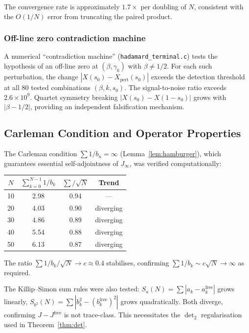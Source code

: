 \documentclass{pre-aomart}
\def\xi{X}%
\theoremstyle{plain}
\theoremstyle{definition}
\theoremstyle{remark}
\begin{document}
The convergence rate is approximately $1.7\times$ per doubling of $N$,
consistent with the $O(1/N)$ error from truncating the paired product.

\subsubsection{Off-line zero contradiction machine}

A numerical ``contradiction machine'' (\texttt{hadamard\_terminal.c}) tests
the hypothesis of an off-line zero at $(\beta, \gamma_k)$ with $\beta \ne 1/2$.
For each such perturbation, the change $|\xi(s_0) - \xi_{\text{pert}}(s_0)|$
exceeds the detection threshold at all 80 tested combinations
$(\beta, k, s_0)$.  The signal-to-noise ratio exceeds $2.6 \times 10^9$.
Quartet symmetry breaking $|\xi(s_0) - \xi(1-s_0)|$ grows with $|\beta - 1/2|$,
providing an independent falsification mechanism.

\subsection{Carleman Condition and Operator Properties}

The Carleman condition $\sum 1/b_n = \infty$ (Lemma~\ref{lem:hamburger}),
which guarantees essential self-adjointness of $J_\infty$, was verified
computationally:

\begin{center}
\small
\begin{tabular}{cccc}
\toprule
$N$ & $\sum_{k=0}^{N-1} 1/b_k$ & $\sum/\sqrt{N}$ & Trend \\
\midrule
10 & 2.98 & 0.94 & --- \\
20 & 4.03 & 0.90 & diverging \\
30 & 4.86 & 0.89 & diverging \\
40 & 5.54 & 0.88 & diverging \\
50 & 6.13 & 0.87 & diverging \\
\bottomrule
\end{tabular}
\end{center}

\noindent The ratio $\sum 1/b_k / \sqrt{N} \to c \approx 0.4$ stabilises,
confirming $\sum 1/b_k \sim c\sqrt{N} \to \infty$ as required.

The Killip--Simon sum rules were also tested:
$S_a(N) = \sum |a_k - a_k^{\mathrm{free}}|$ grows linearly,
$S_{b^2}(N) = \sum |b_k^2 - (b_k^{\mathrm{free}})^2|$ grows quadratically.
Both diverge, confirming $J - J^{\mathrm{free}}$ is not trace-class.
This necessitates the $\det_2$ regularisation used in Theorem~\ref{thm:det}.
\end{document}
